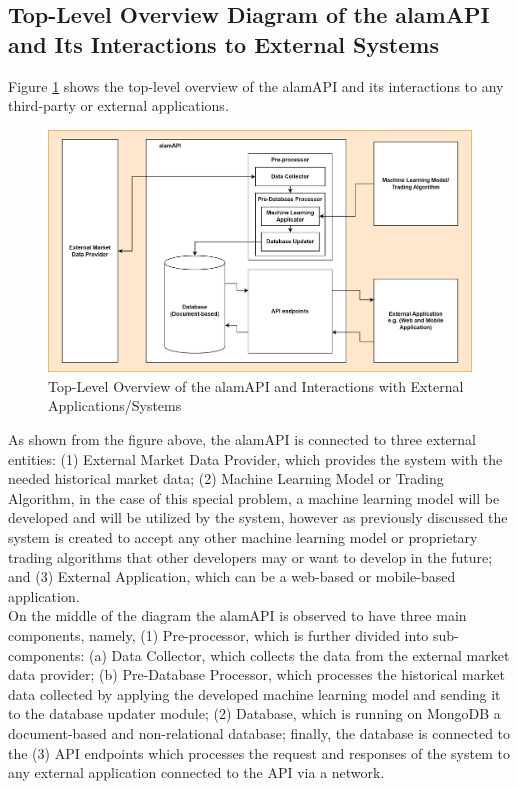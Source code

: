\subsection{Top-Level Overview Diagram of the alamAPI and Its Interactions to External Systems}
\label{subsec:top_level_overview}

Figure \ref{fig:system_overview} shows the top-level overview of the 
alamAPI and its interactions to any third-party or external applications.

\begin{figure}[ht]
    \centering
    \includegraphics[width=1\textwidth]{./assets/SystemOverview.png}
    \caption{Top-Level Overview of the alamAPI and Interactions with External Applications/Systems}
    \label{fig:system_overview}
\end{figure}
\FloatBarrier

As shown from the figure above, the alamAPI is connected to three external 
entities: (1) External Market Data Provider, which provides the system with the 
needed historical market data; (2) Machine Learning Model or Trading Algorithm, 
in the case of this special problem, a machine learning model will be developed and 
will be utilized by the system, however as previously discussed the system is 
created to accept any other machine learning model or proprietary trading algorithms 
that other developers may or want to develop in the future; and 
(3) External Application, which can be a web-based or mobile-based application.
\hfill \\

On the middle of the diagram the alamAPI is observed to have three main components, 
namely, (1) Pre-processor, which is further divided into sub-components: 
(a) Data Collector, which collects the data from the external market data provider; 
(b) Pre-Database Processor, which processes the historical market data collected by 
applying the developed machine learning model and sending it to the database updater 
module; (2) Database, which is running on MongoDB a document-based and non-relational 
database; finally, the database is connected to the (3) API endpoints which processes 
the request and responses of the system to any external application connected to the 
API via a network.